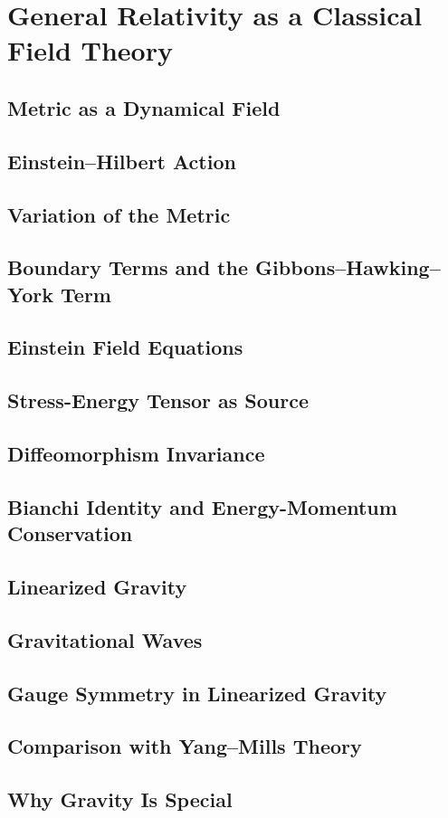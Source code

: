 \chapter{General Relativity as a Classical Field Theory}

\section{Metric as a Dynamical Field}
\section{Einstein--Hilbert Action}
\section{Variation of the Metric}
\section{Boundary Terms and the Gibbons--Hawking--York Term}
\section{Einstein Field Equations}
\section{Stress-Energy Tensor as Source}
\section{Diffeomorphism Invariance}
\section{Bianchi Identity and Energy-Momentum Conservation}
\section{Linearized Gravity}
\section{Gravitational Waves}
\section{Gauge Symmetry in Linearized Gravity}
\section{Comparison with Yang--Mills Theory}
\section{Why Gravity Is Special}
